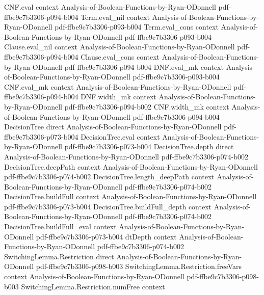 \begin{lemma}
  {CNF.eval}
  {context}
  {Analysis-of-Boolean-Functions-by-Ryan-ODonnell}
  {pdf-ffbe9c7b3306-p094-b004}
\proofstep
  {Term.eval_nil}
  {context}
  {Analysis-of-Boolean-Functions-by-Ryan-ODonnell}
  {pdf-ffbe9c7b3306-p093-b004}
\proofstep
  {Term.eval_cons}
  {context}
  {Analysis-of-Boolean-Functions-by-Ryan-ODonnell}
  {pdf-ffbe9c7b3306-p093-b004}
\proofstep
  {Clause.eval_nil}
  {context}
  {Analysis-of-Boolean-Functions-by-Ryan-ODonnell}
  {pdf-ffbe9c7b3306-p094-b004}
\proofstep
  {Clause.eval_cons}
  {context}
  {Analysis-of-Boolean-Functions-by-Ryan-ODonnell}
  {pdf-ffbe9c7b3306-p094-b004}
\proofstep
  {DNF.eval_mk}
  {context}
  {Analysis-of-Boolean-Functions-by-Ryan-ODonnell}
  {pdf-ffbe9c7b3306-p093-b004}
\proofstep
  {CNF.eval_mk}
  {context}
  {Analysis-of-Boolean-Functions-by-Ryan-ODonnell}
  {pdf-ffbe9c7b3306-p094-b004}
\proofstep
  {DNF.width_mk}
  {context}
  {Analysis-of-Boolean-Functions-by-Ryan-ODonnell}
  {pdf-ffbe9c7b3306-p094-b002}
\proofstep
  {CNF.width_mk}
  {context}
  {Analysis-of-Boolean-Functions-by-Ryan-ODonnell}
  {pdf-ffbe9c7b3306-p094-b004}
\proofstep
  {DecisionTree}
  {direct}
  {Analysis-of-Boolean-Functions-by-Ryan-ODonnell}
  {pdf-ffbe9c7b3306-p073-b004}
\proofstep
  {DecisionTree.eval}
  {context}
  {Analysis-of-Boolean-Functions-by-Ryan-ODonnell}
  {pdf-ffbe9c7b3306-p073-b004}
\proofstep
  {DecisionTree.depth}
  {direct}
  {Analysis-of-Boolean-Functions-by-Ryan-ODonnell}
  {pdf-ffbe9c7b3306-p074-b002}
\proofstep
  {DecisionTree.deepPath}
  {context}
  {Analysis-of-Boolean-Functions-by-Ryan-ODonnell}
  {pdf-ffbe9c7b3306-p074-b002}
\proofstep
  {DecisionTree.length_deepPath}
  {context}
  {Analysis-of-Boolean-Functions-by-Ryan-ODonnell}
  {pdf-ffbe9c7b3306-p074-b002}
\proofstep
  {DecisionTree.buildFull}
  {context}
  {Analysis-of-Boolean-Functions-by-Ryan-ODonnell}
  {pdf-ffbe9c7b3306-p073-b004}
\proofstep
  {DecisionTree.buildFull_depth}
  {context}
  {Analysis-of-Boolean-Functions-by-Ryan-ODonnell}
  {pdf-ffbe9c7b3306-p074-b002}
\proofstep
  {DecisionTree.buildFull_eval}
  {context}
  {Analysis-of-Boolean-Functions-by-Ryan-ODonnell}
  {pdf-ffbe9c7b3306-p073-b004}
\proofstep
  {dtDepth}
  {context}
  {Analysis-of-Boolean-Functions-by-Ryan-ODonnell}
  {pdf-ffbe9c7b3306-p074-b002}
\proofstep
  {SwitchingLemma.Restriction}
  {direct}
  {Analysis-of-Boolean-Functions-by-Ryan-ODonnell}
  {pdf-ffbe9c7b3306-p098-b003}
\proofstep
  {SwitchingLemma.Restriction.freeVars}
  {context}
  {Analysis-of-Boolean-Functions-by-Ryan-ODonnell}
  {pdf-ffbe9c7b3306-p098-b003}
\proofstep
  {SwitchingLemma.Restriction.numFree}
  {context}

\end{lemma}

